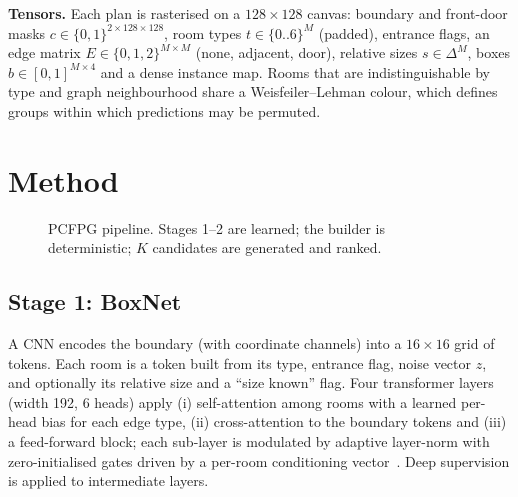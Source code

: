 \documentclass[conference]{IEEEtran}
\begin{document}
\textbf{Tensors.} Each plan is rasterised on a $128\times128$ canvas: boundary and front-door masks $c\in\{0,1\}^{2\times128\times128}$, room types $t\in\{0..6\}^{M}$ (padded), entrance flags, an edge matrix $E\in\{0,1,2\}^{M\times M}$ (none, adjacent, door), relative sizes $s\in\Delta^{M}$, boxes $b\in[0,1]^{M\times4}$ and a dense instance map. Rooms that are indistinguishable by type and graph neighbourhood share a Weisfeiler--Lehman colour, which defines groups within which predictions may be permuted.

\section{Method}
\begin{figure}[t]
\centering
{}
\caption{PCFPG pipeline. Stages 1--2 are learned; the builder is deterministic; $K$ candidates are generated and ranked.}
\label{fig:pipe}
\end{figure}

\subsection{Stage 1: BoxNet}
A CNN encodes the boundary (with coordinate channels) into a $16\times16$ grid of tokens. Each room is a token built from its type, entrance flag, noise vector $z$, and optionally its relative size and a ``size known'' flag. Four transformer layers (width 192, 6 heads) apply (i) self-attention among rooms with a learned per-head bias for each edge type, (ii) cross-attention to the boundary tokens and (iii) a feed-forward block; each sub-layer is modulated by adaptive layer-norm with zero-initialised gates driven by a per-room conditioning vector~\cite{peebles2023dit}. Deep supervision is applied to intermediate layers.
\end{document}
